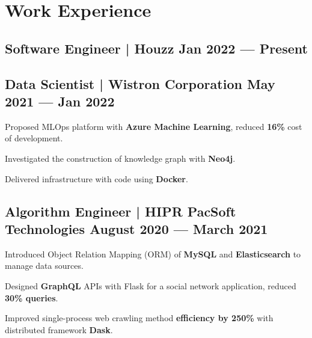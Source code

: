 \section{Work Experience}

\subsection*{Software Engineer | Houzz  \hfill Jan 2022 --- Present} 

\subsection*{Data Scientist | Wistron Corporation  \hfill May 2021 --- Jan 2022} 
    \begin{zitemize}
        \item Proposed MLOps platform with \textbf{Azure Machine Learning}, reduced \textbf{16\%} cost of development.
        \item Investigated the construction of knowledge graph with \textbf{Neo4j}.
        \item Delivered infrastructure with code using \textbf{Docker}.
    \end{zitemize}


\subsection*{Algorithm Engineer | HIPR PacSoft Technologies \hfill August 2020 --- March 2021} 
    \begin{zitemize}
        \item Introduced Object Relation Mapping (ORM) of \textbf{MySQL} and \textbf{Elasticsearch} to manage data sources.
        \item Designed \textbf{GraphQL} APIs with Flask for a social network application, reduced \textbf{30\% queries}.
        \item Improved single-process web crawling method \textbf{efficiency by 250\%} with distributed framework \textbf{Dask}.
    \end{zitemize}


